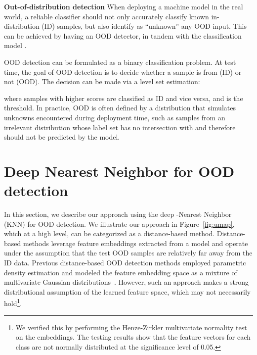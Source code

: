 \documentclass[nohyperref]{article}
\newcommand{\method}{{KNN}}
\theoremstyle{plain}
\theoremstyle{definition}
\theoremstyle{remark}
\begin{document}
\textbf{Out-of-distribution detection} When deploying a machine model in the real world, {a reliable classifier should not only accurately classify known in-distribution (ID) samples, but also identify as ``unknown'' any OOD input}. This can be achieved by having an OOD detector, in tandem with the classification model . 

OOD detection can be formulated as a binary classification problem. At test time, the goal of OOD detection is to decide whether a sample  is from  (ID) or not (OOD). The decision can be made via a level set estimation:
\vspace{-0.1cm}

where samples with higher scores  are classified as ID and vice versa, and   is the threshold. In practice, OOD is often defined by a distribution that simulates unknowns encountered during deployment time, such as samples from an irrelevant distribution {whose label set has no intersection with  and therefore should not be predicted by the model}.




\section{Deep Nearest Neighbor for OOD detection}
\label{sec:knn}

In this section, we describe our approach using the deep -Nearest Neighbor (\method) for OOD detection. We illustrate our approach in Figure~\ref{fig:umap}, which at a high level, can be categorized as a distance-based method. Distance-based methods leverage feature embeddings
extracted from a model and operate under the assumption that the test OOD samples are relatively far away from the ID data. Previous distance-based OOD detection methods employed parametric density estimation and modeled the feature embedding space as a mixture of multivariate Gaussian distributions~\citep{lee2018simple}. However, such an approach makes a strong distributional assumption of the learned feature space, which may not necessarily hold\footnote{We verified this by performing the Henze-Zirkler multivariate normality test~\citep{henze1990class} on the embeddings. The testing results show that the feature vectors for each class are not normally distributed at the significance level of 0.05.}. 
\end{document}
